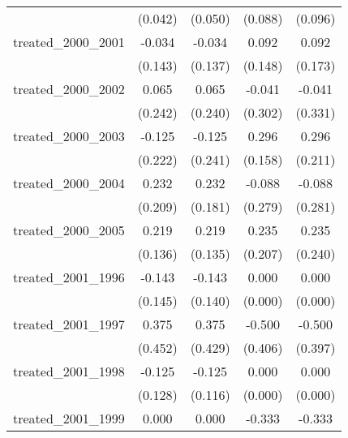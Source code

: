 {\begin{tabular}{l*{4}{c}}
            &     (0.042)         &     (0.050)         &     (0.088)         &     (0.096)         \\
[1em]
treated\_2000\_2001&      -0.034         &      -0.034         &       0.092         &       0.092         \\
            &     (0.143)         &     (0.137)         &     (0.148)         &     (0.173)         \\
[1em]
treated\_2000\_2002&       0.065         &       0.065         &      -0.041         &      -0.041         \\
            &     (0.242)         &     (0.240)         &     (0.302)         &     (0.331)         \\
[1em]
treated\_2000\_2003&      -0.125         &      -0.125         &       0.296         &       0.296         \\
            &     (0.222)         &     (0.241)         &     (0.158)         &     (0.211)         \\
[1em]
treated\_2000\_2004&       0.232         &       0.232         &      -0.088         &      -0.088         \\
            &     (0.209)         &     (0.181)         &     (0.279)         &     (0.281)         \\
[1em]
treated\_2000\_2005&       0.219         &       0.219         &       0.235         &       0.235         \\
            &     (0.136)         &     (0.135)         &     (0.207)         &     (0.240)         \\
[1em]
treated\_2001\_1996&      -0.143         &      -0.143         &       0.000         &       0.000         \\
            &     (0.145)         &     (0.140)         &     (0.000)         &     (0.000)         \\
[1em]
treated\_2001\_1997&       0.375         &       0.375         &      -0.500         &      -0.500         \\
            &     (0.452)         &     (0.429)         &     (0.406)         &     (0.397)         \\
[1em]
treated\_2001\_1998&      -0.125         &      -0.125         &       0.000         &       0.000         \\
            &     (0.128)         &     (0.116)         &     (0.000)         &     (0.000)         \\
[1em]
treated\_2001\_1999&       0.000         &       0.000         &      -0.333         &      -0.333         \\

\end{tabular}}

